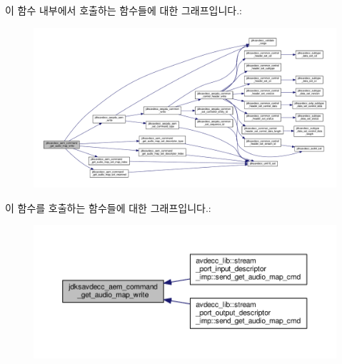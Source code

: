 이 함수 내부에서 호출하는 함수들에 대한 그래프입니다.\+:
\nopagebreak
\begin{figure}[H]
\begin{center}
\leavevmode
\includegraphics[width=350pt]{group__command__get__audio__map_gab104d4a38d80dcee98d130f0c1f7a9b8_cgraph}
\end{center}
\end{figure}




이 함수를 호출하는 함수들에 대한 그래프입니다.\+:
\nopagebreak
\begin{figure}[H]
\begin{center}
\leavevmode
\includegraphics[width=350pt]{group__command__get__audio__map_gab104d4a38d80dcee98d130f0c1f7a9b8_icgraph}
\end{center}
\end{figure}


